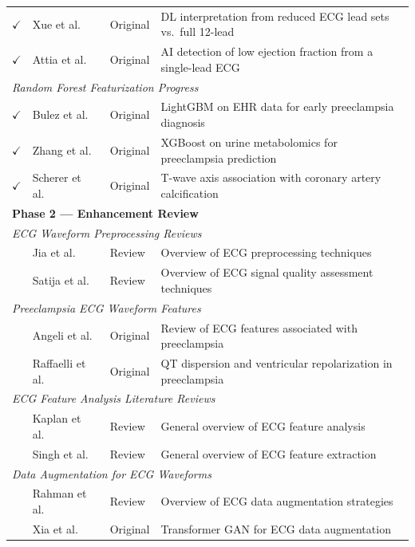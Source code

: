\documentclass[sigconf,nonacm]{acmart}
\begin{document}
\begin{table}[h]
\begin{tabular}{cp{}p{}p{}}
$\checkmark$ & Xue et al.~\cite{xue_does_2024} & Original & DL interpretation from reduced ECG lead sets vs.\ full 12-lead \\
$\checkmark$ & Attia et al.~\cite{attia_automated_2022} & Original & AI detection of low ejection fraction from a single-lead ECG \\
\midrule
\multicolumn{4}{l}{\textit{Random Forest Featurization Progress}} \\
$\checkmark$ & Bulez et al.~\cite{bulez_artificial_2024} & Original & LightGBM on EHR data for early preeclampsia diagnosis \\
$\checkmark$ & Zhang et al.~\cite{zhang_development_2023} & Original & XGBoost on urine metabolomics for preeclampsia prediction \\
$\checkmark$ & Scherer et al.~\cite{scherer_abnormal_2009} & Original & T-wave axis association with coronary artery calcification \\
\midrule
\multicolumn{4}{l}{\textbf{Phase 2 --- Enhancement Review}} \\[2pt]
\multicolumn{4}{l}{\textit{ECG Waveform Preprocessing Reviews}} \\
 & Jia et al.~\cite{jia_preprocessing_2024} & Review & Overview of ECG preprocessing techniques \\
 & Satija et al.~\cite{satija_review_2018} & Review & Overview of ECG signal quality assessment techniques \\
\midrule
\multicolumn{4}{l}{\textit{Preeclampsia ECG Waveform Features}} \\
 & Angeli et al.~\cite{angeli_novel_2015} & Original & Review of ECG features associated with preeclampsia \\
 & Raffaelli et al.~\cite{raffaelli_pre-eclampsia_2014} & Original & QT dispersion and ventricular repolarization in preeclampsia \\
\midrule
\multicolumn{4}{l}{\textit{ECG Feature Analysis Literature Reviews}} \\
 & Kaplan et al.~\cite{kaplan_berkaya_survey_2018} & Review & General overview of ECG feature analysis \\
 & Singh et al.~\cite{singh_ecg_2023} & Review & General overview of ECG feature extraction \\
\midrule
\multicolumn{4}{l}{\textit{Data Augmentation for ECG Waveforms}} \\
 & Rahman et al.~\cite{rahman_systematic_2023} & Review & Overview of ECG data augmentation strategies \\
 & Xia et al.~\cite{xia_generative_2023} & Original & Transformer GAN for ECG data augmentation \\

\end{tabular}
\end{table}
\end{document}
